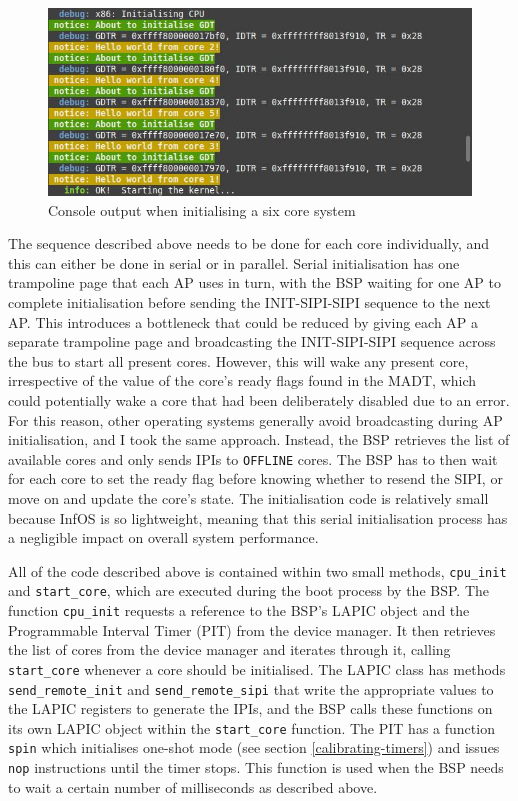 \documentclass[bsc,frontabs,singlespacing,parskip,deptreport]{infthesis}
\begin{document}
\begin{figure}[h]
    \centering
    \includegraphics[scale=0.6]{figures/hello-world.jpg}
    \caption{Console output when initialising a six core system}
    \label{hello-world}
\end{figure}

The sequence described above needs to be done for each core individually, and this can either be done in serial or in parallel. Serial initialisation has one trampoline page that each AP uses in turn, with the BSP waiting for one AP to complete initialisation before sending the INIT-SIPI-SIPI sequence to the next AP. This introduces a bottleneck that could be reduced by giving each AP a separate trampoline page and broadcasting the INIT-SIPI-SIPI sequence across the bus to start all present cores. However, this will wake any present core, irrespective of the value of the core's ready flags found in the MADT, which could potentially wake a core that had been deliberately disabled due to an error. For this reason, other operating systems generally avoid broadcasting during AP initialisation, and I took the same approach. Instead, the BSP retrieves the list of available cores and only sends IPIs to \verb|OFFLINE| cores. The BSP has to then wait for each core to set the ready flag before knowing whether to resend the SIPI, or move on and update the core's state. The initialisation code is relatively small because InfOS is so lightweight, meaning that this serial initialisation process has a negligible impact on overall system performance. 

All of the code described above is contained within two small methods, \verb|cpu_init| and \verb|start_core|, which are executed during the boot process by the BSP. The function \verb|cpu_init| requests a reference to the BSP's LAPIC object and the Programmable Interval Timer (PIT) from the device manager. It then retrieves the list of cores from the device manager and iterates through it, calling \verb|start_core| whenever a core should be initialised. The LAPIC class has methods \verb|send_remote_init| and \verb|send_remote_sipi| that write the appropriate values to the LAPIC registers to generate the IPIs, and the BSP calls these functions on its own LAPIC object within the \verb|start_core| function. The PIT has a function \verb|spin| which initialises one-shot mode (see section \ref{calibrating-timers}) and issues \verb|nop| instructions until the timer stops. This function is used when the BSP needs to wait a certain number of milliseconds as described above.
\end{document}
